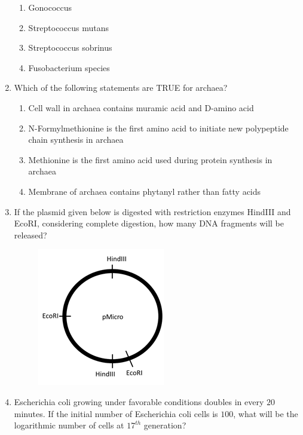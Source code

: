 \documentclass[journal,12pt,onecolumn]{IEEEtran}
\theoremstyle{remark}
\begin{document}
\begin{enumerate}
    \begin{enumerate}
        \item Gonococcus
        \item Streptococcus mutans
        \item Streptococcus sobrinus
        \item Fusobacterium species
    \end{enumerate}

    \item Which of the following statements are TRUE for archaea?

    \hfill{}

    \begin{enumerate}
        \item Cell wall in archaea contains muramic acid and D-amino acid
        \item N-Formylmethionine is the first amino acid to initiate new polypeptide chain synthesis in archaea
        \item Methionine is the first amino acid used during protein synthesis in archaea
        \item Membrane of archaea contains phytanyl rather than fatty acids
    \end{enumerate}

    \item If the plasmid given below is digested with restriction enzymes HindIII and EcoRI, considering complete digestion, how many DNA fragments will be released?

    \hfill{}
    
    \begin{figure}[h!]
        \centering
        \includegraphics[width=0.4\columnwidth]{fig24.png}
        \caption*{}
        \label{fig:q82}
    \end{figure}

    \item Escherichia coli growing under favorable conditions doubles in every $20$ minutes. If the initial number of Escherichia coli cells is $100$, what will be the logarithmic number of cells at $17^{th}$ generation? 


\end{enumerate}
\end{document}
